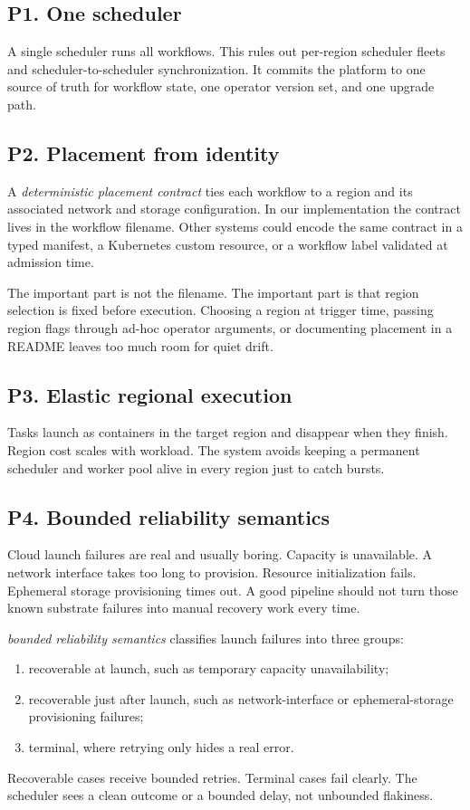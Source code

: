 \documentclass[11pt, reqno]{amsart}
\newcommand{\dpc}{\emph{deterministic placement contract}}
\newcommand{\brs}{\emph{bounded reliability semantics}}
\begin{document}
\subsection{P1. One scheduler}

A single scheduler runs all workflows. This rules out per-region scheduler fleets and scheduler-to-scheduler synchronization. It commits the platform to one source of truth for workflow state, one operator version set, and one upgrade path.

\subsection{P2. Placement from identity}
\label{sec:dpc}

A \dpc{} ties each workflow to a region and its associated network and storage configuration. In our implementation the contract lives in the workflow filename. Other systems could encode the same contract in a typed manifest, a Kubernetes custom resource, or a workflow label validated at admission time.

The important part is not the filename. The important part is that region selection is fixed before execution. Choosing a region at trigger time, passing region flags through ad-hoc operator arguments, or documenting placement in a README leaves too much room for quiet drift.

\subsection{P3. Elastic regional execution}

Tasks launch as containers in the target region and disappear when they finish. Region cost scales with workload. The system avoids keeping a permanent scheduler and worker pool alive in every region just to catch bursts.

\subsection{P4. Bounded reliability semantics}
\label{sec:brs}

Cloud launch failures are real and usually boring. Capacity is unavailable. A network interface takes too long to provision. Resource initialization fails. Ephemeral storage provisioning times out. A good pipeline should not turn those known substrate failures into manual recovery work every time.

\brs{} classifies launch failures into three groups:
\begin{enumerate}
  \item recoverable at launch, such as temporary capacity unavailability;
  \item recoverable just after launch, such as network-interface or ephemeral-storage provisioning failures;
  \item terminal, where retrying only hides a real error.
\end{enumerate}
Recoverable cases receive bounded retries. Terminal cases fail clearly. The scheduler sees a clean outcome or a bounded delay, not unbounded flakiness.
\end{document}
